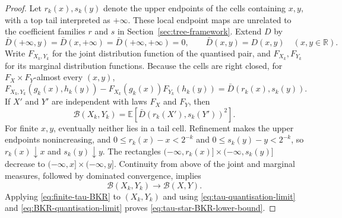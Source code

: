 \documentclass[12pt]{article}
\begin{document}
\begin{proof}
Let $r_k(x),s_k(y)$ denote the upper endpoints of the cells containing
$x,y$, with a top tail interpreted as $+\infty$.  These local endpoint maps
are unrelated to the coefficient families $r$ and $s$ in
Section~\ref{sec:tree-framework}.  Extend
$D$ by
\begin{equation}\label{eq:extended-cdf-discrepancy}
\bar D(+\infty,y)=\bar D(x,+\infty)=\bar D(+\infty,+\infty)=0,
\qquad
\bar D(x,y)=D(x,y)\quad(x,y\in\mathbb R).
\end{equation}
Write $F_{X_k,Y_k}$ for the joint distribution function of the quantised
pair, and $F_{X_k},F_{Y_k}$ for its marginal distribution functions.
Because the cells are right closed, for $F_X\times F_Y$-almost every
$(x,y)$,
\begin{equation}\label{eq:display-097}
F_{X_k,Y_k}(g_k(x),h_k(y))-F_{X_k}(g_k(x))F_{Y_k}(h_k(y))
=\bar D(r_k(x),s_k(y)).
\end{equation}
If $X'$ and $Y'$ are independent with laws $F_X$ and $F_Y$, then
\begin{equation}\label{eq:display-098}
\mathcal B(X_k,Y_k)
=\mathbb E\!\left[\bar D(r_k(X'),s_k(Y'))^2\right].
\end{equation}
For finite $x,y$, eventually neither lies in a tail cell.  Refinement
makes the upper endpoints nonincreasing, and
$0\le r_k(x)-x<2^{-k}$ and $0\le s_k(y)-y<2^{-k}$,
so $r_k(x)\downarrow x$ and $s_k(y)\downarrow y$.  The rectangles
$(-\infty,r_k(x)]\times(-\infty,s_k(y)]$ decrease to
$(-\infty,x]\times(-\infty,y]$.  Continuity from above of the joint and
marginal measures, followed by dominated convergence, implies
\begin{equation}\label{eq:BKR-quantisation-limit}
\mathcal B(X_k,Y_k)\longrightarrow\mathcal B(X,Y).
\end{equation}
Applying \eqref{eq:finite-tau-BKR} to $(X_k,Y_k)$ and using
\eqref{eq:tau-quantisation-limit} and
\eqref{eq:BKR-quantisation-limit} proves
\eqref{eq:tau-star-BKR-lower-bound}.


\end{proof}
\end{document}
